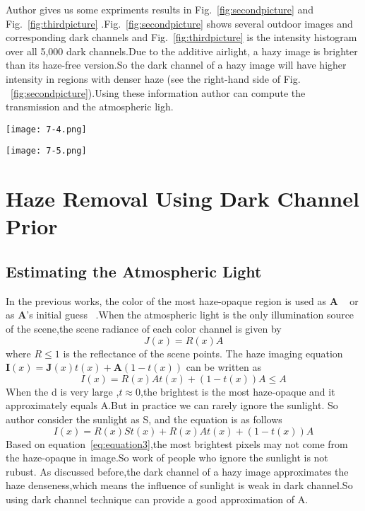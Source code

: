 \documentclass[10pt,twocolumn,letterpaper]{article}
\begin{document}
Author gives us some expriments results in Fig.~\ref{fig:secondpicture} and Fig.~\ref{fig:thirdpicture} .Fig.~\ref{fig:secondpicture} shows several outdoor images and corresponding dark channels and Fig.~\ref{fig:thirdpicture} is the intensity histogram over all 5,000 dark channels.Due to the additive airlight, a hazy image is brighter than its haze-free version.So the dark channel of a hazy image will have higher intensity in regions with denser haze (see the right-hand side of Fig. ~\ref{fig:secondpicture}).Using these information author can compute the transmission and the atmospheric ligh.
\begin{figure*}[htb]
\centering
\texttt{[image: 7-4.png]}
\caption{(a) Example images in our haze-free image database. (b) The corresponding dark channels. (c) A hazy image and its dark channel.}
\label{fig:secondpicture}
\end{figure*}
\begin{figure*}[htb]
\centering
\texttt{[image: 7-5.png]}
\caption{Statistics of the dark channels. (a) Histogram of the intensity of the pixels in all of the 5,000 dark channels (each bin stands for 16 intensity
levels). (b) Cumulative distribution. (c) Histogram of the average intensity of each dark channel.}
\label{fig:thirdpicture}
\end{figure*}

\section{Haze Removal Using Dark Channel Prior}
\subsection{Estimating the Atmospheric Light}
In the previous works, the color of the most haze-opaque
region is used as \textbf{A} ~\cite{Visibility2008_5} or as \textbf{A}'s initial guess ~\cite{Single2008_4}.When the atmospheric light is the only illumination source of the scene,the scene radiance of each color channel is given by
\begin{equation}
J(x)=R(x)A
\end{equation}
where $R \leq 1$ is the reflectance of the scene points. The haze imaging equation 
$\textbf{I}(x) = \textbf{J}(x)t(x) + \textbf{A}(1-t(x))$ can be written as \begin{equation}
I(x)=R(x)At(x)+(1-t(x))A \leq A
\end{equation}
When the d is very large ,$t \approx 0$,the brightest is the most haze-opaque and it approximately equals A.But in practice we can rarely ignore the sunlight. So author consider the sunlight as S, and the equation is as follows
\begin{equation}
I(x)=R(x)St(x) + R(x)At(x) +(1-t(x))A \label{eq:equation3}
\end{equation} 
Based on equation~\ref{eq:equation3},the most brightest pixels may not come from the haze-opaque in image.So work of people who ignore the sunlight is not rubust.  As discussed before,the dark channel of a hazy image approximates the haze denseness,which means the influence of sunlight is weak in dark channel.So using dark channel technique can provide a good approximation of A.
\end{document}
